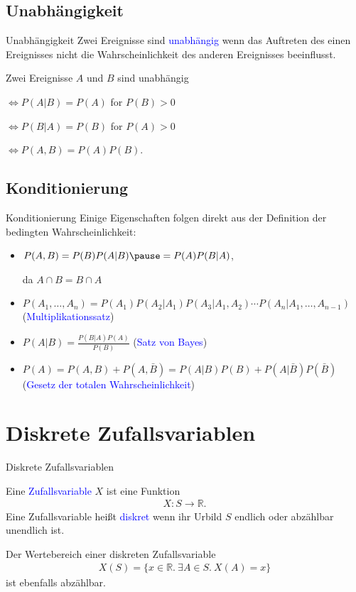\documentclass{beamer}
\def\padding{\vspace{0.5cm}}
\def\b{\textcolor{blue}}
\begin{document}
\subsection{Unabhängigkeit}
\begin{frame}{Unabhängigkeit}
    Zwei Ereignisse sind \b{unabhängig} wenn das Auftreten des einen Ereignisses nicht die Wahrscheinlichkeit des anderen Ereignisses beeinflusst.\pause\par\padding
    Zwei Ereignisse $A$ und $B$ sind unabhängig\par
    $\iff P(A|B) = P(A)$ for $P(B) > 0$\pause\par
    $\iff P(B|A) = P(B)$ for $P(A) > 0$\pause\par
    $\iff P(A,B) = P(A) P(B)$.
\end{frame}

\subsection{Konditionierung}
\begin{frame}{Konditionierung}
    Einige Eigenschaften folgen direkt aus der Definition der bedingten Wahrscheinlichkeit:\pause
    \begin{itemize}
        \item $P(A,B) = P(B) P(A|B)\pause = P(A) P(B|A)$,\par da $A \cap B = B \cap A$\pause
        \item $P(A_1, \dots, A_n) = P(A_1) P(A_2|A_1) P(A_3|A_1, A_2) \cdots P(A_n|A_1, \dots, A_{n-1})$ (\b{Multiplikationssatz})\pause
        \item $P(A|B) = \frac{P(B|A) P(A)}{P(B)}$ (\b{Satz von Bayes})\pause
        \item $P(A) = P(A,B) + P(A,\bar{B}) = P(A|B) P(B) + P(A|\bar{B}) P(\bar{B})$ (\b{Gesetz der totalen Wahrscheinlichkeit})
    \end{itemize}
\end{frame}

\section{Diskrete Zufallsvariablen}
\begin{frame}{Diskrete Zufallsvariablen}
    \begin{definition}
        Eine \b{Zufallsvariable} $X$ ist eine Funktion
        \begin{align*}
            X: S \to \mathbb{R}.
        \end{align*}\pause
        Eine Zufallsvariable heißt \b{diskret} wenn ihr Urbild $S$ endlich oder abzählbar unendlich ist.
    \end{definition}\pause\padding
    Der Wertebereich einer diskreten Zufallsvariable
    \begin{align*}
        X(S) = \{x \in \mathbb{R}.\ \exists A \in S.\ X(A) = x\}
    \end{align*}
    ist ebenfalls abzählbar.
\end{frame}
\end{document}
